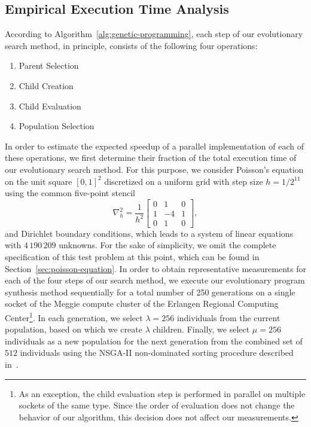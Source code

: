 \subsection{Empirical Execution Time Analysis}
\label{sec:execution-time-analysis}
According to Algorithm~\ref{alg:genetic-programming}, each step of our evolutionary search method, in principle, consists of the following four operations:
\begin{enumerate}
	\item Parent Selection
	\item Child Creation
	\item Child Evaluation
	\item Population Selection
\end{enumerate}
In order to estimate the expected speedup of a parallel implementation of each of these operations, we first determine their fraction of the total execution time of our evolutionary search method.
For this purpose, we consider Poisson's equation on the unit square $\left[0,1\right]^2$ discretized on a uniform grid with step size $h = 1/2^{11}$ using the common five-point stencil
\begin{equation*}
	\nabla^2_h = 
	\frac{1}{h^2} \begin{bmatrix}
		0 & 1 & 0\\
		1 & -4 & 1 \\
		0 & 1 & 0  
	\end{bmatrix},
\end{equation*}
and Dirichlet boundary conditions, which leads to a system of linear equations with $4\,190\,209$ unknowns.
For the sake of simplicity, we omit the complete specification of this test problem at this point, which can be found in Section~\ref{sec:poisson-equation}.
In order to obtain representative measurements for each of the four steps of our search method, we execute our evolutionary program synthesis method sequentially for a total number of 250 generations on a single socket of the Meggie compute cluster of the Erlangen Regional Computing Center\footnote{As an exception, the child evaluation step is performed in parallel on multiple sockets of the same type. Since the order of evaluation does not change the behavior of our algorithm, this decision does not affect our measurements.}.
In each generation, we select $\lambda = 256$ individuals from the current population, based on which we create $\lambda$ children.
Finally, we select $\mu = 256$ individuals as a new population for the next generation from the combined set of $512$ individuals using the NSGA-II non-dominated sorting procedure described in~\cite{deb2002fast}.

